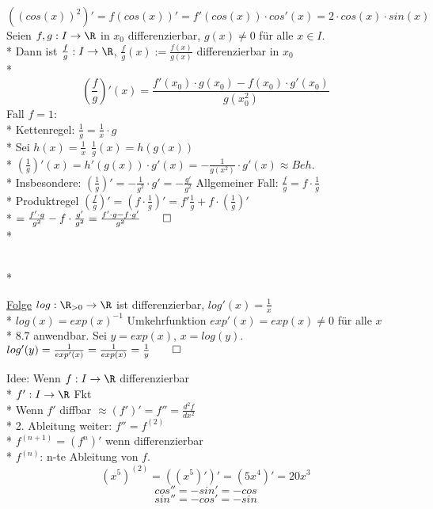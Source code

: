 $((cos (x))^2)' = f(cos (x))' = f'(cos (x)) \cdot cos'(x) = 2 \cdot cos(x) \cdot sin(x)$
Seien $f, g: I \to \R$ in $x_0$ differenzierbar, $g(x) \neq 0$ für alle $x \in I$.\\*
Dann ist $\frac{f}{g}: I \to \R$, $\frac{f}{g}(x) := \frac{f(x)}{g(x)}$ differenzierbar in $x_0$\\*
$$(\frac{f}{g})'(x) = \frac{f'(x_0)\cdot g(x_0) - f(x_0) \cdot g'(x_0)}{g(x_0^2)}$$
\bew
Fall $f = 1$:\\*
Kettenregel:
$\frac{1}{g} = \frac{1}{x} \cdot g$\\*
Sei $h(x) = \frac{1}{x}\ \ \frac{1}{g}(x) = h(g(x))$ \\*
$(\frac{1}{g})'(x) = h'(g(x)) \cdot g'(x) = - \frac{1}{g(x^2)} \cdot g'(x) \approx Beh.$\\*
Insbesondere: $(\frac{1}{g})' = -\frac{1}{g^2} \cdot g' = -\frac{g'}{g^2}$
Allgemeiner Fall:
$\frac{f}{g} = f \cdot \frac{1}{g}$\\*
Produktregel \Rarr{} $(\frac{f}{g})' = (f \cdot \frac{1}{g})' = f'\frac{1}{g} + f \cdot (\frac{1}{g})'$\\*
$= \frac{f' \cdot g}{g^2} - f\cdot \frac{g'}{g^2} = \frac{f'\cdot g - f \cdot g'}{g^2} \qed$\\*


\\*

\ul{Folge} $log: \R_{>0}\to \R$ ist differenzierbar, $log'(x) = \frac{1}{x}$\\*
\bew
$log(x) = exp(x)^{-1}$ Umkehrfunktion $exp'(x) = exp(x) \neq 0$ für alle $x$\\*
\Rarr{} 8.7 anwendbar. Sei $y = exp(x)$, $x = log(y)$.
$log'(y) = \frac{1}{exp'(x)} = \frac{1}{exp(x)} = \frac{1}{y}\qed$


Idee: Wenn $f: I \to \R$ differenzierbar\\*
\approx $f':I \to \R$ Fkt\\*
Wenn $f'$ diffbar $ \approx (f')' = f'' = \frac{d^2f}{dx^2}$\\*
2. Ableitung weiter:
$f'' = f^{(2)}$\\*
$f^{(n+1)} = (f^{n})'$ wenn differenzierbar\\*
$f^{(n)}$: n-te Ableitung von $f$.
\bsp
$$(x^5)^{(2)} = ((x^5)')' = (5x^4)' = 20x^3$$
$$cos'' = -sin' = -cos$$
$$sin'' = -cos' = -sin$$

